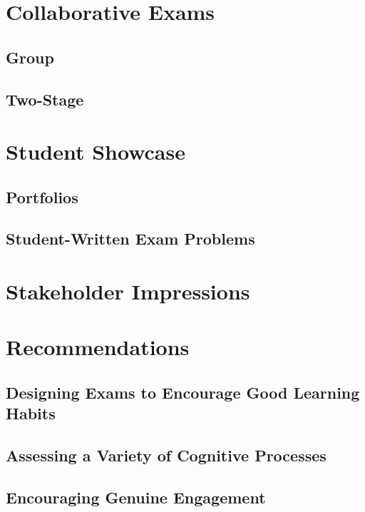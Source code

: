 \documentclass{article}
\begin{document}
\section{Collaborative Exams}
\subsection{Group}
\subsection{Two-Stage}


\section{Student Showcase}
\subsection{Portfolios}
\subsection{Student-Written Exam Problems}


\section{Stakeholder Impressions}

\section{Recommendations}
\subsection{Designing Exams to Encourage Good Learning Habits}
\subsection{Assessing a Variety of Cognitive Processes}
\subsection{Encouraging Genuine Engagement}
\nocite{*}


\end{document}
